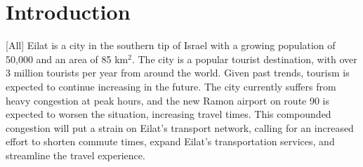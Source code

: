 \documentclass[12pt]{article}                               %
\newcommand{\textapprox}{\raisebox{0.1ex}{\texttildelow}}   %
\begin{document}
\begin{abstract}
    
    Eilat is a city in southern Israel with a population of \textapprox50,000, \textapprox3 million tourists/year, and severe congestion. This project aimed to aid city planners in improving transportation services, minimizing environmental impact, and investigating smart city technologies. Smart cities research was conducted, including case studies, listings of technologies, and relevant analyses. An interactive website was created for planners, displaying transport and regional flight information. Suggestions for services and citywide goals were developed to reduce congestion and further smart city goals.
\end{abstract}
\newpage

\tableofcontents\newpage
\listofauthorships
\listoffigures
\newpage

\pagestyle{fancy}
\onehalfspacing

\section{Introduction}[All]\label{sec:intro}
Eilat is a city in the southern tip of Israel with a growing population of \textapprox50,000 and an area of 85 km$^2$. The city is a popular tourist destination, with over 3 million tourists per year from around the world. Given past trends, tourism is expected to continue increasing in the future. The city currently suffers from heavy congestion at peak hours, and the new Ramon airport on route 90 is expected to worsen the situation, increasing travel times. This compounded congestion will put a strain on Eilat's transport network, calling for an increased effort to shorten commute times, expand Eilat's transportation services, and streamline the travel experience. 
\end{document}
